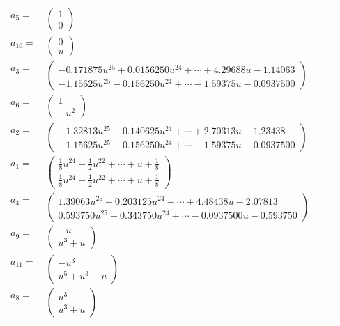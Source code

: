\documentclass[1p]{elsarticle_modified}
\theoremstyle{definition}
\begin{document}
\begin{tabular}{m{7pt} m{180pt} m{7pt} m{180pt} }
\flushright $a_{5}=$&$\begin{pmatrix}1\\0\end{pmatrix}$ \\
\flushright $a_{10}=$&$\begin{pmatrix}0\\u\end{pmatrix}$ \\
\flushright $a_{3}=$&$\begin{pmatrix}-0.171875 u^{25}+0.0156250 u^{24}+\cdots+4.29688 u-1.14063\\-1.15625 u^{25}-0.156250 u^{24}+\cdots-1.59375 u-0.0937500\end{pmatrix}$ \\
\flushright $a_{6}=$&$\begin{pmatrix}1\\- u^2\end{pmatrix}$ \\
\flushright $a_{2}=$&$\begin{pmatrix}-1.32813 u^{25}-0.140625 u^{24}+\cdots+2.70313 u-1.23438\\-1.15625 u^{25}-0.156250 u^{24}+\cdots-1.59375 u-0.0937500\end{pmatrix}$ \\
\flushright $a_{1}=$&$\begin{pmatrix}\frac{1}{8} u^{24}+\frac{1}{2} u^{22}+\cdots+u+\frac{1}{8}\\\frac{1}{8} u^{24}+\frac{1}{2} u^{22}+\cdots+u+\frac{1}{8}\end{pmatrix}$ \\
\flushright $a_{4}=$&$\begin{pmatrix}1.39063 u^{25}+0.203125 u^{24}+\cdots+4.48438 u-2.07813\\0.593750 u^{25}+0.343750 u^{24}+\cdots-0.0937500 u-0.593750\end{pmatrix}$ \\
\flushright $a_{9}=$&$\begin{pmatrix}- u\\u^3+u\end{pmatrix}$ \\
\flushright $a_{11}=$&$\begin{pmatrix}- u^3\\u^5+u^3+u\end{pmatrix}$ \\
\flushright $a_{8}=$&$\begin{pmatrix}u^3\\u^3+u\end{pmatrix}$ \\

\end{tabular}
\end{document}
